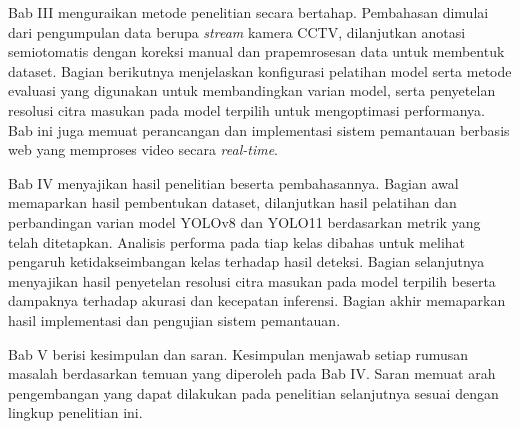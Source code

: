 Bab III menguraikan metode penelitian secara bertahap. Pembahasan dimulai dari pengumpulan 
data berupa \textit{stream} kamera CCTV, dilanjutkan anotasi semiotomatis dengan koreksi 
manual dan prapemrosesan data untuk membentuk dataset. Bagian berikutnya menjelaskan 
konfigurasi pelatihan model serta metode evaluasi yang digunakan untuk membandingkan 
varian model, serta penyetelan resolusi citra masukan pada model terpilih untuk 
mengoptimasi performanya. Bab ini juga memuat perancangan dan implementasi sistem 
pemantauan berbasis web yang memproses video secara \textit{real-time}.

Bab IV menyajikan hasil penelitian beserta pembahasannya. Bagian awal memaparkan hasil 
pembentukan dataset, dilanjutkan hasil pelatihan dan perbandingan varian model YOLOv8 dan 
YOLO11 berdasarkan metrik yang telah ditetapkan. Analisis performa pada tiap kelas 
dibahas untuk melihat pengaruh ketidakseimbangan kelas terhadap hasil deteksi. Bagian 
selanjutnya menyajikan hasil penyetelan resolusi citra masukan
pada model terpilih beserta dampaknya terhadap akurasi dan kecepatan inferensi. Bagian
akhir memaparkan hasil implementasi dan pengujian sistem pemantauan.

Bab V berisi kesimpulan dan saran. Kesimpulan menjawab setiap rumusan masalah berdasarkan 
temuan yang diperoleh pada Bab IV. Saran memuat arah pengembangan yang dapat dilakukan 
pada penelitian selanjutnya sesuai dengan lingkup penelitian ini.